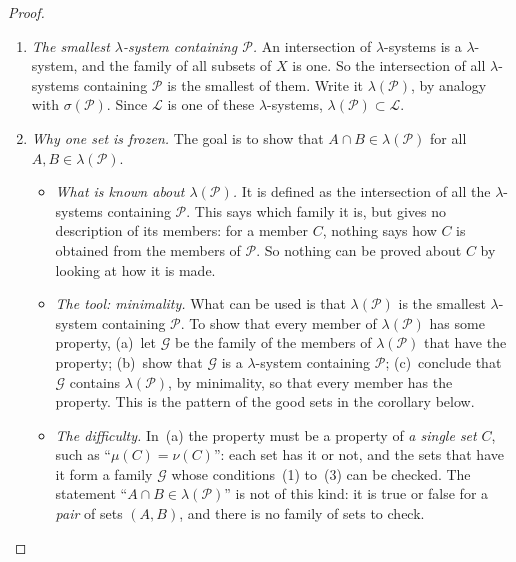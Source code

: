 \begin{notechapter}
\begin{proof}
\begin{enumerate}[nosep]
  \item \emph{The smallest $\lambda$-system containing $\mathcal P$.}
        An intersection of $\lambda$-systems is a $\lambda$-system, and
        the family of all subsets of $X$ is one. So the intersection of
        all $\lambda$-systems containing $\mathcal P$ is the smallest of
        them. Write it $\lambda(\mathcal P)$, by analogy with
        $\sigma(\mathcal P)$. Since $\mathcal L$ is one of these
        $\lambda$-systems, $\lambda(\mathcal P)\subset\mathcal L$.
  \item \emph{Why one set is frozen.} The goal is to show that
        $A\cap B\in\lambda(\mathcal P)$ for all
        $A, B\in\lambda(\mathcal P)$.
        \begin{itemize}[nosep]
          \item \emph{What is known about $\lambda(\mathcal P)$.} It is
                defined as the intersection of all the
                $\lambda$-systems containing $\mathcal P$. This says
                which family it is, but gives no description of its
                members: for a member $C$, nothing says how $C$ is
                obtained from the members of $\mathcal P$. So nothing can
                be proved about $C$ by looking at how it is made.
          \item \emph{The tool: minimality.} What can be used is that
                $\lambda(\mathcal P)$ is the smallest $\lambda$-system
                containing $\mathcal P$. To show that every member of
                $\lambda(\mathcal P)$ has some property, (a)~let
                $\mathcal G$ be the family of the members of
                $\lambda(\mathcal P)$ that have the property; (b)~show
                that $\mathcal G$ is a $\lambda$-system containing
                $\mathcal P$; (c)~conclude that $\mathcal G$ contains
                $\lambda(\mathcal P)$, by minimality, so that every
                member has the property. This is the pattern of the
                good sets in the corollary below.
          \item \emph{The difficulty.} In~(a) the property must be a
                property of \emph{a single set} $C$, such as
                ``$\mu(C) = \nu(C)$'': each set has it or not, and the
                sets that have it form a family $\mathcal G$ whose
                conditions~(1) to~(3) can be checked. The statement
                ``$A\cap B\in\lambda(\mathcal P)$'' is not of this kind:
                it is true or false for a \emph{pair} of sets $(A, B)$,
                and there is no family of sets to check.

\end{itemize}
\end{enumerate}
\end{proof}
\end{notechapter}
